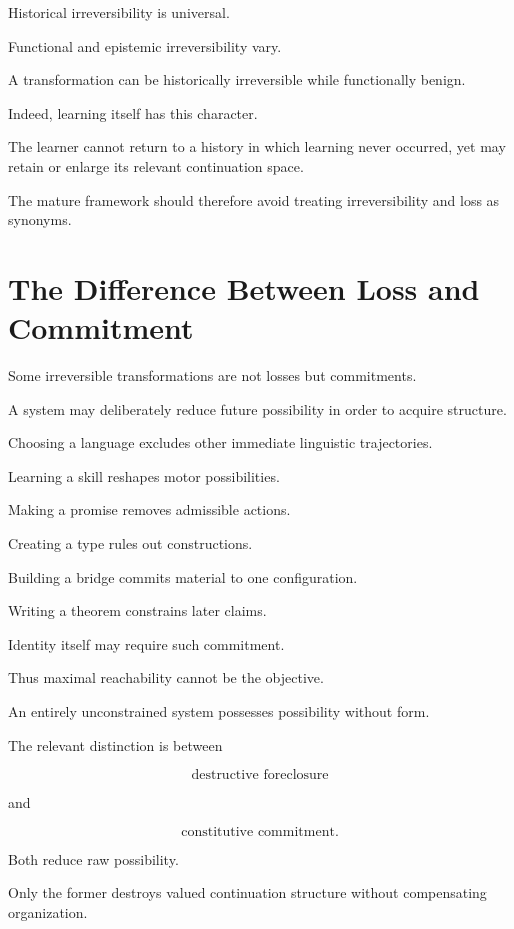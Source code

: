 \documentclass[11pt]{article}
\theoremstyle{remark}
\begin{document}
Historical irreversibility is universal.

Functional and epistemic irreversibility vary.

A transformation can be historically irreversible while functionally benign.

Indeed, learning itself has this character.

The learner cannot return to a history in which learning never occurred, yet may retain or enlarge its relevant continuation space.

The mature framework should therefore avoid treating irreversibility and loss as synonyms.

\section{The Difference Between Loss and Commitment}

Some irreversible transformations are not losses but commitments.

A system may deliberately reduce future possibility in order to acquire structure.

Choosing a language excludes other immediate linguistic trajectories.

Learning a skill reshapes motor possibilities.

Making a promise removes admissible actions.

Creating a type rules out constructions.

Building a bridge commits material to one configuration.

Writing a theorem constrains later claims.

Identity itself may require such commitment.

Thus maximal reachability cannot be the objective.

An entirely unconstrained system possesses possibility without form.

The relevant distinction is between

\begin{equation}
\text{destructive foreclosure}
\end{equation}

and

\begin{equation}
\text{constitutive commitment}.
\end{equation}

Both reduce raw possibility.

Only the former destroys valued continuation structure without compensating organization.
\end{document}
